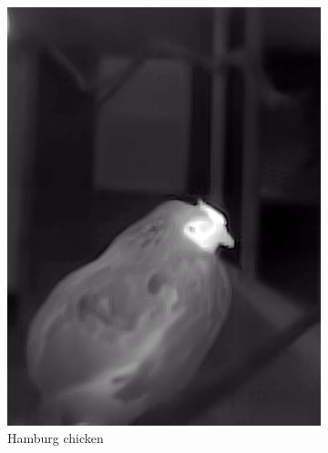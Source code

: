 \documentclass{l4proj}
\begin{document}
\begin{figure}[ht]
\begin{subfigure}[h!]{0.18\textwidth}
    \includegraphics[width=\textwidth, trim={0cm 2.5cm 0cm 2.5cm}, clip]{images/dataset/pretty_chicken/lwir.png}
    \caption{Hamburg chicken}
  \end{subfigure}
  \\
  \begin{subfigure}[h!]{0.18\textwidth}

\end{subfigure}
\end{figure}
\end{document}
